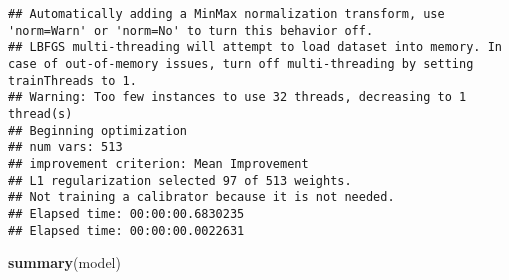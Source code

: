 \documentclass[]{book}
\newenvironment{Shaded}{\begin{snugshade}}{\end{snugshade}}
\newcommand{\KeywordTok}[1]{\textcolor[rgb]{0.13,0.29,0.53}{\textbf{#1}}}
\newcommand{\NormalTok}[1]{#1}
\theoremstyle{definition}
\theoremstyle{definition}
\theoremstyle{definition}
\theoremstyle{remark}
\begin{document}
\begin{verbatim}
## Automatically adding a MinMax normalization transform, use 'norm=Warn' or 'norm=No' to turn this behavior off.
## LBFGS multi-threading will attempt to load dataset into memory. In case of out-of-memory issues, turn off multi-threading by setting trainThreads to 1.
## Warning: Too few instances to use 32 threads, decreasing to 1 thread(s)
## Beginning optimization
## num vars: 513
## improvement criterion: Mean Improvement
## L1 regularization selected 97 of 513 weights.
## Not training a calibrator because it is not needed.
## Elapsed time: 00:00:00.6830235
## Elapsed time: 00:00:00.0022631
\end{verbatim}

\begin{Shaded}
\begin{Highlighting}[]
\KeywordTok{summary}\NormalTok{(model)}
\end{Highlighting}
\end{Shaded}
\end{document}
